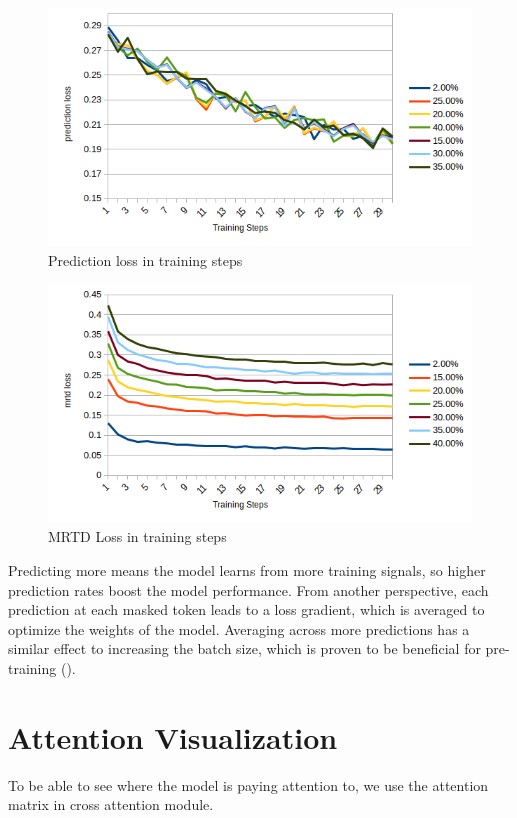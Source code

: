\begin{figure}
  \includegraphics[width=\linewidth]{img/mrtd_prd_loss.png}
  \caption{Prediction loss in training steps}
  \label{img:mrtd_prd_loss}
\end{figure}

\begin{figure}
  \includegraphics[width=\linewidth]{img/mrtd_loss.png}
  \caption{MRTD Loss in training steps}
  \label{img:mrtd_loss}
\end{figure}

Predicting more means the model learns from more training signals, so higher prediction rates boost the model performance. From another perspective, each prediction at each masked token leads to a loss gradient, which is averaged to optimize the weights of the model. Averaging across more predictions has a similar effect to increasing the batch size, which is proven to be beneficial for pre-training (\cite{liu2019robertarobustlyoptimizedbert}). 

\section{Attention Visualization}
To be able to see where the model is paying attention to, we use the attention matrix in cross attention module. 

